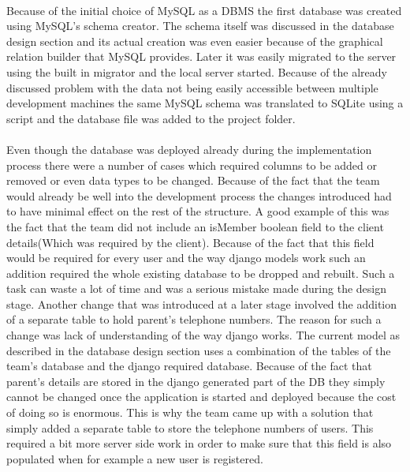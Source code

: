 \documentclass{l3proj}
\begin{document}
\\Because of the initial choice of MySQL as a DBMS the first database was created using MySQL's schema creator. The schema itself was discussed in the database design section and its actual creation was even easier because of the graphical relation builder that MySQL provides. Later it was easily migrated to the server using the built in migrator and the local server started. Because of the already discussed problem with the data not being easily accessible between multiple development machines the same MySQL schema was translated to SQLite using a script and the database file was added to the project folder.\\
\\Even though the database was deployed already during the implementation process there were a number of cases which required columns to be added or removed or even data types to be changed. Because of the fact that the team would already be well into the development process the changes introduced had to have minimal effect on the rest of the structure. A good example of this was the fact that the team did not include an isMember boolean field to the client details(Which was required by the client). Because of the fact that this field would be required for every user and the  way django models work such an addition required the whole existing database to be dropped and rebuilt. Such a task can waste a lot of time and was a serious mistake made during the design stage. Another change that was introduced at a later stage involved the addition of a separate table to hold parent's telephone numbers. The reason for such a change was lack of understanding of the way django works. The current model as described in the database design section uses a combination of the tables of the team's database and the django required database. Because of the fact that parent's details are stored in the django generated part of the DB they simply cannot be changed once the application is started and deployed because the cost of doing so is enormous. This is why the team came up with a solution that simply added a separate table to store the telephone numbers of users. This required a bit more server side work in order to make sure that this field is also populated when for example a new user is registered.
\end{document}
